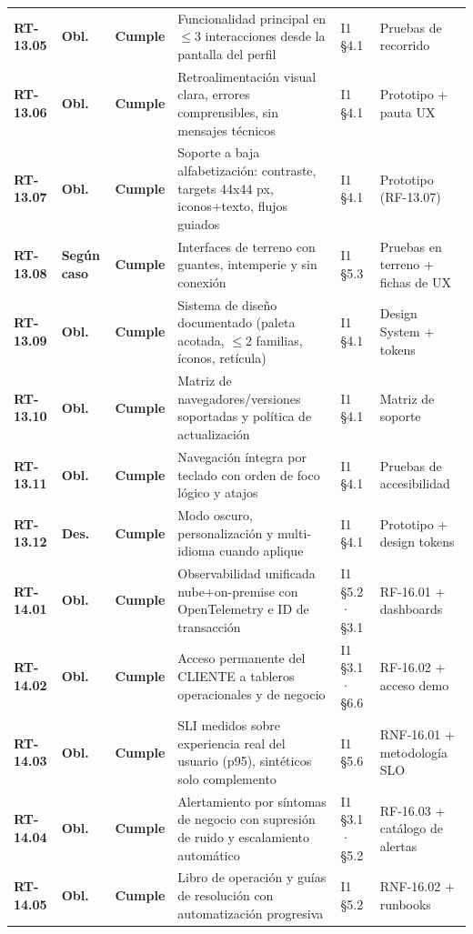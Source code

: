 \begin{small}
\begin{longtable}{@{}p{1.35cm} p{1.15cm} p{1.15cm} p{4.6cm} p{2.35cm} p{3.8cm}@{}}
\textbf{RT-13.05} & \textbf{Obl.} & \textbf{Cumple} & Funcionalidad principal en $\leq$3 interacciones desde la pantalla del perfil & I1 §4.1 & Pruebas de recorrido \\
\textbf{RT-13.06} & \textbf{Obl.} & \textbf{Cumple} & Retroalimentaci\'on visual clara, errores comprensibles, sin mensajes t\'ecnicos & I1 §4.1 & Prototipo + pauta UX \\
\textbf{RT-13.07} & \textbf{Obl.} & \textbf{Cumple} & Soporte a baja alfabetizaci\'on: contraste, targets 44x44 px, iconos+texto, flujos guiados & I1 §4.1 & Prototipo (RF-13.07) \\
\textbf{RT-13.08} & \textbf{Según caso} & \textbf{Cumple} & Interfaces de terreno con guantes, intemperie y sin conexi\'on & I1 §5.3 & Pruebas en terreno + fichas de UX \\
\textbf{RT-13.09} & \textbf{Obl.} & \textbf{Cumple} & Sistema de dise\~no documentado (paleta acotada, $\leq$2 familias, \'iconos, ret\'icula) & I1 §4.1 & Design System + tokens \\
\textbf{RT-13.10} & \textbf{Obl.} & \textbf{Cumple} & Matriz de navegadores/versiones soportadas y pol\'itica de actualizaci\'on & I1 §4.1 & Matriz de soporte \\
\textbf{RT-13.11} & \textbf{Obl.} & \textbf{Cumple} & Navegaci\'on \'integra por teclado con orden de foco l\'ogico y atajos & I1 §4.1 & Pruebas de accesibilidad \\
\textbf{RT-13.12} & \textbf{Des.} & \textbf{Cumple} & Modo oscuro, personalizaci\'on y multi-idioma cuando aplique & I1 §4.1 & Prototipo + design tokens \\
\textbf{RT-14.01} & \textbf{Obl.} & \textbf{Cumple} & Observabilidad unificada nube+on-premise con OpenTelemetry e ID de transacci\'on & I1 §5.2 · §3.1 & RF-16.01 + dashboards \\
\textbf{RT-14.02} & \textbf{Obl.} & \textbf{Cumple} & Acceso permanente del CLIENTE a tableros operacionales y de negocio & I1 §3.1 · §6.6 & RF-16.02 + acceso demo \\
\textbf{RT-14.03} & \textbf{Obl.} & \textbf{Cumple} & SLI medidos sobre experiencia real del usuario (p95), sint\'eticos solo complemento & I1 §5.6 & RNF-16.01 + metodolog\'ia SLO \\
\textbf{RT-14.04} & \textbf{Obl.} & \textbf{Cumple} & Alertamiento por s\'intomas de negocio con supresi\'on de ruido y escalamiento autom\'atico & I1 §3.1 · §5.2 & RF-16.03 + cat\'alogo de alertas \\
\textbf{RT-14.05} & \textbf{Obl.} & \textbf{Cumple} & Libro de operaci\'on y gu\'ias de resoluci\'on con automatizaci\'on progresiva & I1 §5.2 & RNF-16.02 + runbooks \\

\end{longtable}
\end{small}
